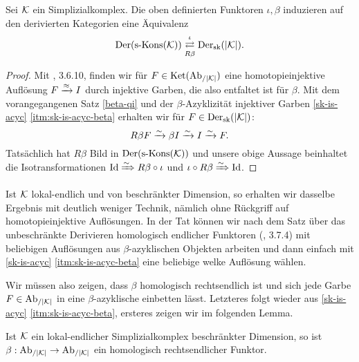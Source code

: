 \begin{theorem}
  Sei $\mathcal{K}$ ein Simplizialkomplex. Die oben definierten Funktoren
  $\iota, \beta$ induzieren auf den derivierten Kategorien eine
  Äquivalenz
  \[ \operatorname{Der}(\operatorname{s-Kons}(\mathcal{K}))
  \mathrel{\mathop{\rightleftarrows}^{\iota}_{R \beta}}
  \operatorname{Der}_{\mathrm{sk}}(|\mathcal{K}|). \]
\end{theorem}
\begin{proof}

  Mit \cite{TD}, 3.6.10, finden wir für $F \in \operatorname{Ket}(\operatorname{Ab}_{/|\mathcal{K}|})$ eine
  homotopieinjektive Auflösung $F \xrightarrow{\approx} I$ durch injektive Garben, die
  also entfaltet ist für $\beta$. Mit dem vorangegangenen Satz
  \ref{beta-qi} und der $\beta$-Azyklizität injektiver Garben
  \ref{sk-is-acyc} \ref{itm:sk-is-acyc-beta} erhalten wir für $F \in
  \operatorname{Der}_{\mathrm{sk}}(|\mathcal{K}|)$:
  \[R \beta F \xrightarrow[]{\sim} \beta I \xrightarrow[]{\sim} I \xrightarrow[]{\sim} F. \]
  Tatsächlich hat $R \beta$ Bild in $\operatorname{Der}(\operatorname{s-Kons}(\mathcal{K}))$ und unsere
  obige Aussage beinhaltet die Isotransformationen $\operatorname{Id} \xRightarrow{\sim} R
  \beta \circ \iota$ und $\iota \circ R \beta \xRightarrow{\sim} \operatorname{Id}$.
\end{proof}
\begin{bem}
  Ist $\mathcal{K}$ lokal-endlich und von beschränkter Dimension, so erhalten
  wir dasselbe Ergebnis mit deutlich weniger Technik, nämlich ohne
  Rückgriff auf homotopieinjektive Auflösungen. In der Tat können wir
  nach dem Satz über das unbeschränkte Derivieren homologisch
  endlicher Funktoren (\cite{TG}, 3.7.4) mit beliebigen Auflösungen
  aus $\beta$-azyklischen Objekten arbeiten und dann einfach mit
  \ref{sk-is-acyc} \ref{itm:sk-is-acyc-beta} eine beliebige welke
  Auflösung wählen.

  Wir müssen also zeigen, dass $\beta$ homologisch rechtsendlich ist
  und sich jede Garbe $F \in \operatorname{Ab}_{/|\mathcal{K}|}$ in eine $\beta$-azyklische
  einbetten lässt. Letzteres folgt wieder aus \ref{sk-is-acyc}
  \ref{itm:sk-is-acyc-beta}, ersteres zeigen wir im folgenden Lemma.


\end{bem}
\begin{lemma}
  Ist $\mathcal{K}$ ein lokal-endlicher Simplizialkomplex beschränkter
  Dimension, so ist $\beta: \operatorname{Ab}_{/|\mathcal{K}|} \to \operatorname{Ab}_{/|\mathcal{K}|}$ ein homologisch
  rechtsendlicher Funktor.

\end{lemma}

